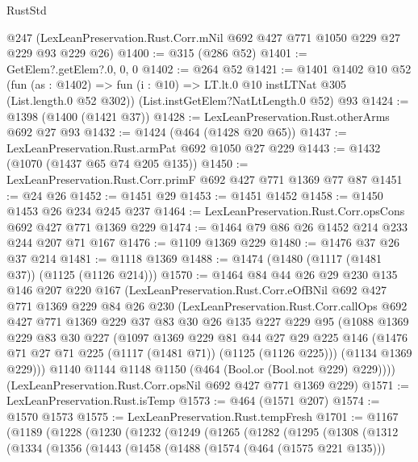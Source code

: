 \begin{lexlean}{RustStd}
\begin{coremodule}
    @247
    (LexLeanPreservation.Rust.Corr.mNil @692 @427 @771 @1050 @229 @27 @229 @93 @229 @26)
@1400 := @315 (@286 @52)
@1401 := GetElem?.getElem?.{0, 0, 0}
@1402 := @264 @52
@1421 := @1401
    @1402
    @10
    @52
    (fun (as : @1402) => fun (i : @10) => LT.lt.{0} @10 instLTNat @305 (List.length.{0} @52 @302))
    (List.instGetElem?NatLtLength.{0} @52)
    @93
@1424 := @1398 (@1400 (@1421 @37))
@1428 := LexLeanPreservation.Rust.otherArms @692 @27 @93
@1432 := @1424 (@464 (@1428 @20 @65))
@1437 := LexLeanPreservation.Rust.armPat @692 @1050 @27 @229
@1443 := @1432 (@1070 (@1437 @65 @74 @205 @135))
@1450 := LexLeanPreservation.Rust.Corr.primF @692 @427 @771 @1369 @77 @87
@1451 := @24 @26
@1452 := @1451 @29
@1453 := @1451 @1452
@1458 := @1450 @1453 @26 @234 @245 @237
@1464 := LexLeanPreservation.Rust.Corr.opsCons @692 @427 @771 @1369 @229
@1474 := @1464 @79 @86 @26 @1452 @214 @233 @244 @207 @71 @167
@1476 := @1109 @1369 @229
@1480 := @1476 @37 @26 @37 @214
@1481 := @1118 @1369
@1488 := @1474 (@1480 (@1117 (@1481 @37)) (@1125 (@1126 @214)))
@1570 := @1464
    @84
    @44
    @26
    @29
    @230
    @135
    @146
    @207
    @220
    @167
    (LexLeanPreservation.Rust.Corr.eOfBNil
      @692
      @427
      @771
      @1369
      @229
      @84
      @26
      @230
      (LexLeanPreservation.Rust.Corr.callOps
        @692
        @427
        @771
        @1369
        @229
        @37
        @83
        @30
        @26
        @135
        @227
        @229
        @95
        (@1088
          @1369
          @229
          @83
          @30
          @227
          (@1097
            @1369
            @229
            @81
            @44
            @27
            @29
            @225
            @146
            (@1476 @71 @27 @71 @225 (@1117 (@1481 @71)) (@1125 (@1126 @225)))
            (@1134 @1369 @229)))
        @1140
        @1144
        @1148
        @1150
        (@464 (Bool.or (Bool.not @229) @229))))
    (LexLeanPreservation.Rust.Corr.opsNil @692 @427 @771 @1369 @229)
@1571 := LexLeanPreservation.Rust.isTemp
@1573 := @464 (@1571 @207)
@1574 := @1570 @1573
@1575 := LexLeanPreservation.Rust.tempFresh
@1701 := @1167
    (@1189
      (@1228
        (@1230
          (@1232
            (@1249
              (@1265
                (@1282
                  (@1295
                    (@1308
                      (@1312
                        (@1334
                          (@1356
                            (@1443
                              (@1458
                                (@1488
                                  (@1574 (@464 (@1575 @221 @135)))

\end{coremodule}
\end{lexlean}
